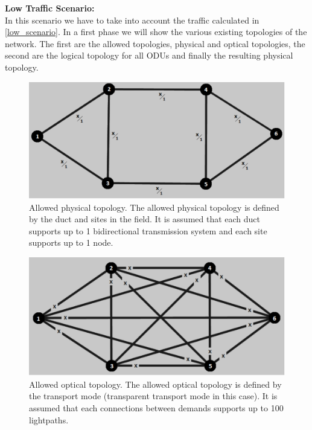 \noindent
\textbf{Low Traffic Scenario:}\\

In this scenario we have to take into account the traffic calculated in \ref{low_scenario}. In a first phase we will show the various existing topologies of the network. The first are the allowed topologies, physical and optical topologies, the second are the logical topology for all ODUs and finally the resulting physical topology.\\

\begin{figure}[H]
\centering
\includegraphics[width=13cm]{sdf/heuristic/transparent_protection/figures/allowed_physical}
\caption{Allowed physical topology. The allowed physical topology is defined by the duct and sites in the field. It is assumed that each duct supports up to 1 bidirectional transmission system and each site supports up to 1 node.}
\label{allowed_physical_protection_ref_low_heuristic_transparent}
\end{figure}

\begin{figure}[H]
\centering
\includegraphics[width=13cm]{sdf/heuristic/transparent_protection/figures/allowed_optical}
\caption{Allowed optical topology. The allowed optical topology is defined by the transport mode (transparent transport mode in this case). It is assumed that each connections between demands supports up to 100 lightpaths.}
\label{allowed_optical_protection_ref_low_heuristic_transparent}
\end{figure}

